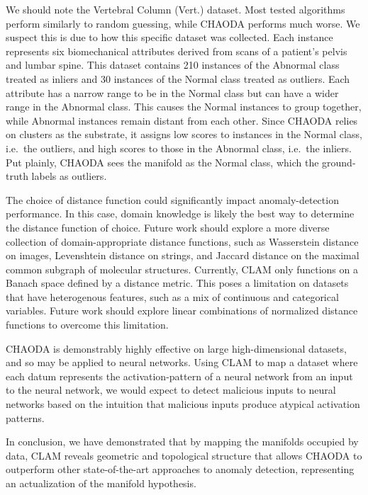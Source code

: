 We should note the Vertebral Column (Vert.) dataset.
Most tested algorithms perform similarly to random guessing, while CHAODA performs much worse.
We suspect this is due to how this specific dataset was collected.
Each instance represents six biomechanical attributes derived from scans of a patient's pelvis and lumbar spine.
This dataset contains 210 instances of the Abnormal class treated as inliers and 30 instances of the Normal class treated as outliers.
Each attribute has a narrow range to be in the Normal class but can have a wider range in the Abnormal class.
This causes the Normal instances to group together, while Abnormal instances remain distant from each other.
Since CHAODA relies on clusters as the substrate, it assigns low scores to instances in the Normal class, i.e.\ the outliers, and high scores to those in the Abnormal class, i.e.\ the inliers.
Put plainly, CHAODA sees the manifold as the Normal class, which the ground-truth labels as outliers.

The choice of distance function could significantly impact anomaly-detection performance.
In this case, domain knowledge is likely the best way to determine the distance function of choice.
Future work should explore a more diverse collection of domain-appropriate distance functions, such as Wasserstein distance on images, Levenshtein distance on strings, and Jaccard distance on the maximal common subgraph of molecular structures.
Currently, CLAM only functions on a Banach space defined by a distance metric.
This poses a limitation on datasets that have heterogenous features, such as a mix of continuous and categorical variables.
Future work should explore linear combinations of normalized distance functions to overcome this limitation.


CHAODA is demonstrably highly effective on large high-dimensional datasets, and so may be applied to neural networks.
Using CLAM to map a dataset where each datum represents the activation-pattern of a neural network from an input to the neural network, we would expect to detect malicious inputs to neural networks based on the intuition that malicious inputs produce atypical activation patterns.

In conclusion, we have demonstrated that by mapping the manifolds occupied by data, CLAM reveals geometric and topological structure that allows CHAODA to outperform other state-of-the-art approaches to anomaly detection, representing an actualization of the manifold hypothesis.
